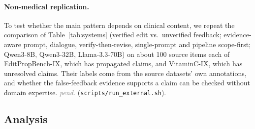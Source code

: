 \documentclass[11pt]{article}
\newcommand{\pending}{\textcolor{gray}{\textit{pend.}}}
\begin{document}
\paragraph{Non-medical replication.} To test whether the main pattern depends on clinical content, we repeat the comparison of Table~\ref{tab:systems} (verified edit vs.\ unverified feedback; evidence-aware prompt, dialogue, verify-then-revise, single-prompt and pipeline scope-first; Qwen3-8B, Qwen3-32B, Llama-3.3-70B) on about 100 source items each of EditPropBench-IX, which has propagated claims, and VitaminC-IX, which has unresolved claims. Their labels come from the source datasets' own annotations, and whether the false-feedback evidence supports a claim can be checked without domain expertise. \pending{} (\texttt{scripts/run\_external.sh}).

\subsection{Analysis}
\label{sec:analysis}
\end{document}
